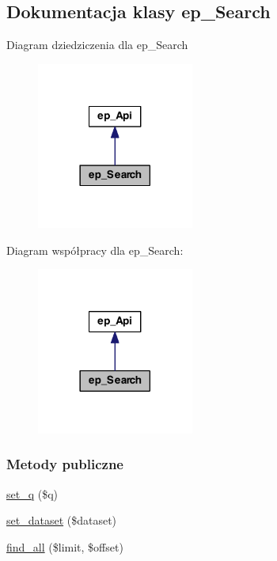 \hypertarget{classep___search}{\subsection{Dokumentacja klasy ep\-\_\-\-Search}
\label{classep___search}
}


Diagram dziedziczenia dla ep\-\_\-\-Search\nopagebreak
\begin{figure}[H]
\begin{center}
\leavevmode
\includegraphics[width=146pt]{classep___search__inherit__graph}
\end{center}
\end{figure}


Diagram współpracy dla ep\-\_\-\-Search\-:\nopagebreak
\begin{figure}[H]
\begin{center}
\leavevmode
\includegraphics[width=146pt]{classep___search__coll__graph}
\end{center}
\end{figure}
\subsubsection*{Metody publiczne}
\begin{DoxyCompactItemize}
\item 
\hyperlink{classep___search_a1b8d79db0f723d8187d80a2e435b9e6a}{set\-\_\-q} (\$q)
\item 
\hyperlink{classep___search_a454970aff52196d59eeff994419e0d8c}{set\-\_\-dataset} (\$dataset)
\item 
\hyperlink{classep___search_a6a71885a6440a34e8cfc7553306f95a6}{find\-\_\-all} (\$limit, \$offset)
\end{DoxyCompactItemize}
